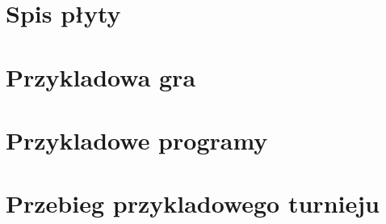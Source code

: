 \documentclass[licencjacka]{pracamgr}
\begin{document}
\chapter{Spis p{\l}yty}

\appendix

\chapter{Przykladowa gra}

\chapter{Przykladowe programy}

\chapter{Przebieg przykladowego turnieju}

\begin{thebibliography}{99}
\end{thebibliography}
\end{document}
